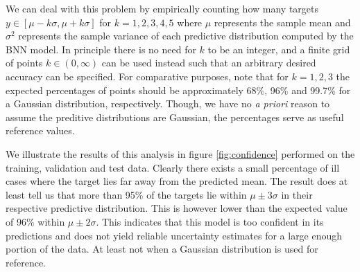 We can deal with this problem by empirically counting how many targets $y \in [\mu - k\sigma, \mu + k \sigma]$ for $k = 1, 2, 3, 4, 5$ where $\mu$ represents the sample mean and $\sigma^2$ represents the sample variance of each predictive distribution computed by the BNN model. In principle there is no need for $k$ to be an integer, and a finite grid of points $k \in (0, \infty)$ can be used instead such that an arbitrary desired accuracy can be specified. 
For comparative purposes, note that for $k = 1, 2, 3$ the expected percentages of points should be approximately 68\%, 96\% and 99.7\% for a Gaussian distribution, respectively. Though, we have no \textit{a priori} reason to assume the preditive distributions are Gaussian, the percentages serve as useful reference values.

We illustrate the results of this analysis in figure \ref{fig:confidence} performed on the training, validation and test data. Clearly there exists a small percentage of ill cases where the target lies far away from the predicted mean. The result does at least tell us that more than 95\% of the targets lie within $\mu \pm 3\sigma$ in their respective predictive distribution. This is however lower than the expected value of 96\% within $\mu \pm 2\sigma$. This indicates that this model is too confident in its predictions and does not yield reliable uncertainty estimates for a large enough portion of the data. At least not when a Gaussian distribution is used for reference.
